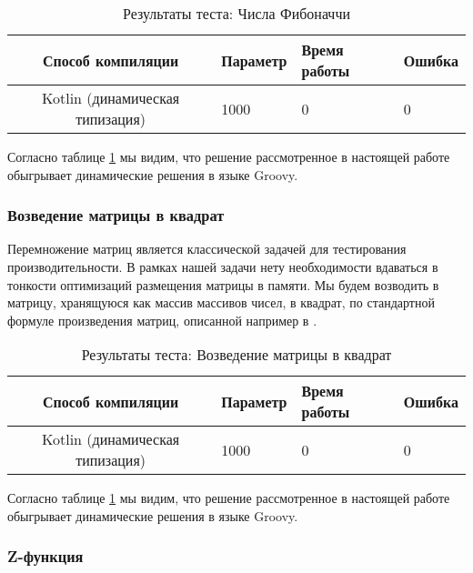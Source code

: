 \begin{table}[h]
\caption{\label{tab:fibBenchResults}Результаты теста: Числа Фибоначчи}
\begin{center}
\begin{tabular}{|c|l|l|l|}
\hline
Способ компиляции & Параметр	& Время работы & Ошибка \\
\hline
Kotlin (динамическая типизация) & 1000 & 0 & 0 \\
\hline
\end{tabular}
\end{center}
\end{table} 


Согласно таблице \ref{tab:fibBenchResults} мы видим, что решение рассмотренное в настоящей работе обыгрывает динамические решения в языке Groovy.


\subsubsection{Возведение матрицы в квадрат}

Перемножение матриц является классической задачей для тестирования производительности. В рамках нашей задачи нету необходимости вдаваться в тонкости оптимизаций размещения матрицы в памяти. Мы будем возводить в матрицу, хранящуюся как массив массивов чисел, в квадрат, по стандартной формуле произведения матриц, описанной например в \cite{book:KryakvinVadimDLinAlgebra}. 

\begin{table}[h]
\caption{\label{tab:matrixSquareBenchResults}Результаты теста: Возведение матрицы в квадрат}
\begin{center}
\begin{tabular}{|c|l|l|l|}
\hline
Способ компиляции & Параметр	& Время работы & Ошибка \\
\hline
Kotlin (динамическая типизация) & 1000 & 0 & 0 \\
\hline
\end{tabular}
\end{center}
\end{table} 


Согласно таблице \ref{tab:fibBenchResults} мы видим, что решение рассмотренное в настоящей работе обыгрывает динамические решения в языке Groovy.

\subsubsection{Z-функция}



